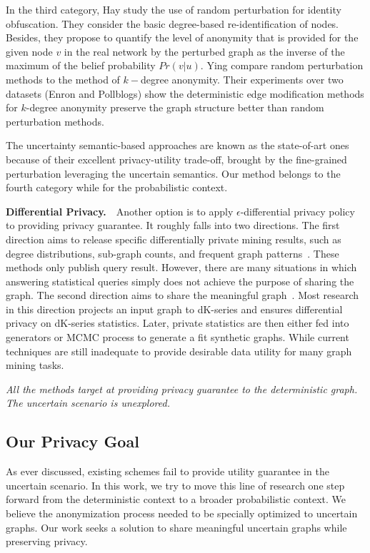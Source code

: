 In the third category, Hay {\etal} \cite{Liu_Privacy_2009} study the use of random perturbation for identity obfuscation. They consider the basic degree-based re-identification of nodes. Besides, they propose to quantify the level of anonymity that is provided for the given node $v$ in the real network by the perturbed graph as the inverse of the maximum of the belief probability $Pr(v|u)$. Ying {\etal} \cite{Ying_Randomizing_2008} compare random perturbation methods to the method of $k-$degree anonymity. Their experiments over two datasets (Enron and Pollblogs) show the deterministic edge modification methods for $k$-degree anonymity preserve the graph structure better than random perturbation methods.

The uncertainty semantic-based approaches are known as the state-of-art ones because of their excellent privacy-utility trade-off, brought by the fine-grained perturbation leveraging the uncertain semantics. 
Our method belongs to the fourth category while for the probabilistic context. 

 
\textbf{Differential Privacy.}~~Another option is to apply {$\epsilon$}-differential privacy policy to providing privacy guarantee. It roughly falls into two directions. The first direction aims to release specific differentially private mining results, such as degree distributions, sub-graph counts, and frequent graph patterns~\cite{Xiao_Differentially_2014,Day:2016}. These methods only publish query result. However, there are many situations in which answering statistical queries simply does not achieve the purpose of sharing the graph.  
The second direction aims to share the meaningful graph~\cite{Sala_Sharing_2011}. Most research in this direction projects an input graph to dK-series and ensures differential privacy on dK-series statistics. Later, private statistics are then either fed into generators or MCMC process to generate a fit synthetic graphs. While current techniques are still inadequate to provide desirable data utility for many graph mining tasks. 

\emph{All the methods target at providing privacy guarantee to the deterministic graph. The uncertain scenario is unexplored.}

\subsection{Our Privacy Goal}
As ever discussed, existing schemes fail to provide utility guarantee in the uncertain scenario. 
In this work, we try to move this line of research one step forward from the deterministic context to a broader probabilistic context. 
We believe the anonymization process needed to be specially optimized to uncertain graphs.
Our work seeks a solution to share meaningful uncertain graphs while preserving privacy.

